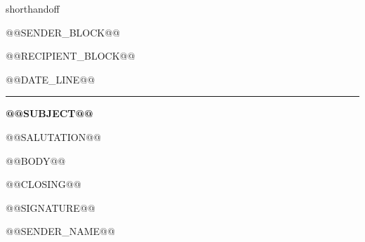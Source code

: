 \documentclass[11pt,a4paper]{article}
\begin{document}
\ifcsname shorthandoff\endcsname{}\fi

\raggedright
\begin{flushright}\small
@@SENDER_BLOCK@@
\end{flushright}
\vspace{0.1cm}

@@RECIPIENT_BLOCK@@

\vspace{0.25cm}

\begin{flushright}
@@DATE_LINE@@
\end{flushright}

{\color{accent}\rule{\linewidth}{0.5pt}}
\vspace{0.2cm}

{\color{accent}\textbf{@@SUBJECT@@}}

\vspace{0.25cm}

@@SALUTATION@@

\vspace{0.3cm}

@@BODY@@

\vspace{0.15cm}

\begin{samepage}
@@CLOSING@@

@@SIGNATURE@@

@@SENDER_NAME@@
\end{samepage}
\end{document}
